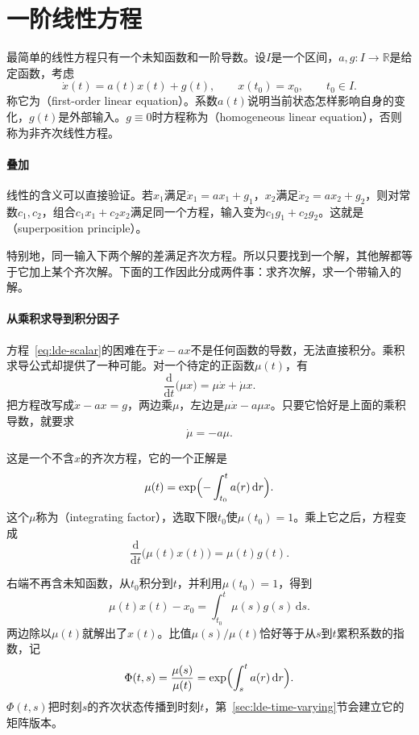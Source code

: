 \section{一阶线性方程}
\label{sec:lde-first-order}

最简单的线性方程只有一个未知函数和一阶导数。设$I$是一个区间，$a,g:I\to\mathbb{R}$是给定函数，考虑
\begin{equation}
 \dot{x}(t)=a(t)x(t)+g(t),\qquad x(t_0)=x_0,\qquad t_0\in I.
 \label{eq:lde-scalar}
\end{equation}
称它为（first-order linear equation）。系数$a(t)$说明当前状态怎样影响自身的变化，$g(t)$是外部输入。$g\equiv0$时方程称为（homogeneous linear equation），否则称为非齐次线性方程。

\paragraph{叠加}
线性的含义可以直接验证。若$x_1$满足$\dot{x}_1=ax_1+g_1$，$x_2$满足$\dot{x}_2=ax_2+g_2$，则对常数$c_1,c_2$，组合$c_1x_1+c_2x_2$满足同一个方程，输入变为$c_1g_1+c_2g_2$。这就是（superposition principle）。

特别地，同一输入下两个解的差满足齐次方程。所以只要找到一个解，其他解都等于它加上某个齐次解。下面的工作因此分成两件事：求齐次解，求一个带输入的解。

\paragraph{从乘积求导到积分因子}
方程~\eqref{eq:lde-scalar}的困难在于$\dot{x}-ax$不是任何函数的导数，无法直接积分。乘积求导公式却提供了一种可能。对一个待定的正函数$\mu(t)$，有
\[
 \frac{\mathrm{d}}{\mathrm{d}t}\bigl(\mu x\bigr)=\mu\dot{x}+\dot{\mu}x.
\]
把方程改写成$\dot{x}-ax=g$，两边乘$\mu$，左边是$\mu\dot{x}-a\mu x$。只要它恰好是上面的乘积导数，就要求
\[
 \dot{\mu}=-a\mu.
\]

这是一个不含$x$的齐次方程，它的一个正解是
\begin{equation}
 \mu(t)=\exp\Bigl(-\int_{t_0}^{t}a(r)\,\mathrm{d}r\Bigr).
 \label{eq:lde-integrating-factor}
\end{equation}
这个$\mu$称为（integrating factor），选取下限$t_0$使$\mu(t_0)=1$。乘上它之后，方程变成
\[
 \frac{\mathrm{d}}{\mathrm{d}t}\bigl(\mu(t)x(t)\bigr)=\mu(t)g(t).
\]

右端不再含未知函数，从$t_0$积分到$t$，并利用$\mu(t_0)=1$，得到
\[
 \mu(t)x(t)-x_0=\int_{t_0}^{t}\mu(s)g(s)\,\mathrm{d}s.
\]
两边除以$\mu(t)$就解出了$x(t)$。比值$\mu(s)/\mu(t)$恰好等于从$s$到$t$累积系数的指数，记
\begin{equation}
 \Phi(t,s)=\frac{\mu(s)}{\mu(t)}=\exp\Bigl(\int_{s}^{t}a(r)\,\mathrm{d}r\Bigr).
 \label{eq:lde-scalar-propagator}
\end{equation}
$\Phi(t,s)$把时刻$s$的齐次状态传播到时刻$t$，第~\ref{sec:lde-time-varying}节会建立它的矩阵版本。

